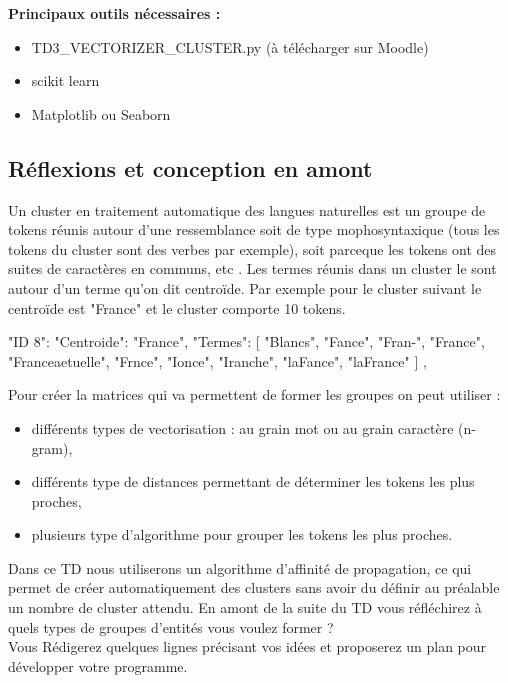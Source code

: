 \textbf{Principaux outils nécessaires :}
\begin{itemize}
\item TD3\_VECTORIZER\_CLUSTER.py (à télécharger sur Moodle)
  \item scikit learn
  \item Matplotlib ou Seaborn
  
\end{itemize}

\vspace{0.5cm}
\subsection{Réflexions et conception en amont}
\vspace{0.5cm}
\label{sec:amont}

Un cluster en traitement automatique des langues naturelles est un groupe de tokens réunis autour d'une ressemblance soit de type mophosyntaxique (tous les tokens du cluster sont des verbes par exemple), soit parceque les tokens ont des suites de caractères en communs, etc . Les termes réunis dans un cluster le sont autour d'un terme qu'on dit centroïde. 
Par exemple pour le cluster suivant le centroïde est "France" et le cluster comporte 10 tokens.

\begin{python}
"ID 8": {
    "Centroide": "France",
    "Termes": [
      "Blancs",
      "Fance",
      "Fran-",
      "France",
      "Franceaetuelle",
      "Frnce",
      "Ionce",
      "Iranche",
      "laFance",
      "laFrance"
    ]
  },
  
\end{python}

Pour créer la matrices qui va permettent de former les groupes on peut utiliser :
\begin{itemize}
\item différents types de vectorisation : au grain mot ou au grain caractère (n-gram),
\item différents type de distances permettant de déterminer les tokens les plus proches,
\item plusieurs type d'algorithme pour grouper les tokens les plus proches.
\end{itemize}

Dans ce TD nous utiliserons un algorithme d'affinité de propagation, ce qui permet de créer automatiquement des clusters sans avoir du définir au préalable un nombre de cluster attendu. 
\newline
En amont de la suite du TD vous réfléchirez à quels types de groupes d'entités vous voulez former ?\\
Vous Rédigerez quelques lignes précisant vos idées et proposerez un plan pour développer votre programme.

